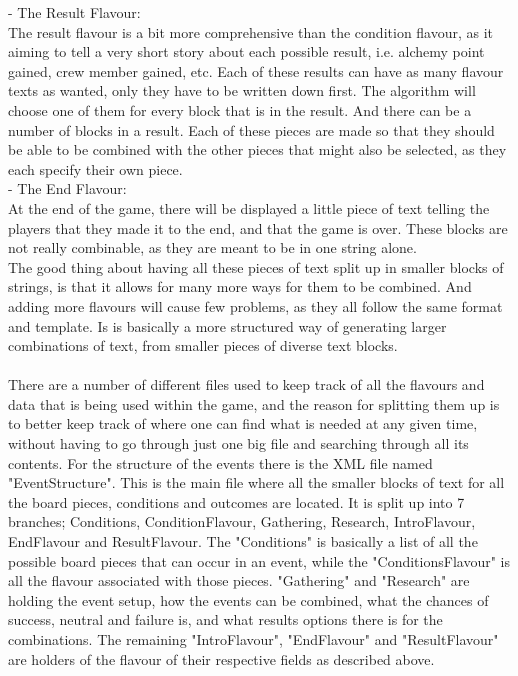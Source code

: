 - The Result Flavour:\\

The result flavour is a bit more comprehensive than the  condition flavour, as it aiming to tell a very short story about each possible result, i.e. alchemy point gained, crew member gained, etc.
Each of these results can have as many flavour texts as wanted, only they have to be written down first. The algorithm will choose one of them for every block that is in the result. And there can be a number of blocks in a result. Each of these pieces are made so that they should be able to be combined with the other pieces that might also be selected, as they each specify their own piece. \\

- The End Flavour:\\

At the end of the game, there will be displayed a little piece of text telling the players that they made it to the end, and that the game is over. These blocks are not really combinable, as they are meant to be in one string alone.\\

The good thing about having all these pieces of text split up in smaller blocks of strings, is that it allows for many more ways for them to be combined. And adding more flavours will cause few problems, as they all follow the same format and template. Is is basically a more structured way of generating larger combinations of text, from smaller pieces of diverse text blocks.\\\\


There are a number of different files used to keep track of all the flavours and data that is being used within the game, and the reason for splitting them up is to better keep track of where one can find what is needed at any given time, without having to go through just one big file and searching through all its contents.
For the structure of the events there is the XML file named "EventStructure". This is the main file where all the smaller blocks of text for all the board pieces, conditions and outcomes are located. It is split up into 7 branches; Conditions, ConditionFlavour, Gathering, Research, IntroFlavour, EndFlavour and ResultFlavour.
The "Conditions" is basically a list of all the possible board pieces that can occur in an event, while the "ConditionsFlavour" is all the flavour associated with those pieces.
"Gathering" and "Research" are holding the event setup, how the events can be combined, what the chances of success, neutral and failure is, and what results options there is for the combinations.
The remaining "IntroFlavour", "EndFlavour" and "ResultFlavour" are holders of the flavour of their respective fields as described above.\\




